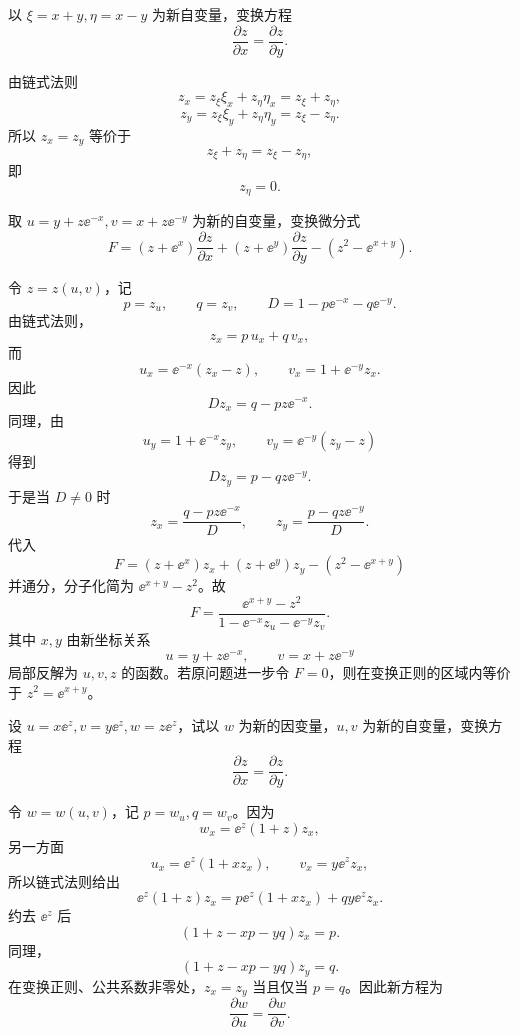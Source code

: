 \begin{xexercise}[3]
以 $\xi=x+y,\eta=x-y$ 为新自变量，变换方程
  \[
    \frac{\partial z}{\partial x}=\frac{\partial z}{\partial y}.
  \]
\end{xexercise}
\begin{xsolution}
由链式法则
\[
  z_x=z_\xi\xi_x+z_\eta\eta_x=z_\xi+z_\eta,
\]
\[
  z_y=z_\xi\xi_y+z_\eta\eta_y=z_\xi-z_\eta.
\]
所以 $z_x=z_y$ 等价于
\[
  z_\xi+z_\eta=z_\xi-z_\eta,
\]
即
\[
  \boxed{z_\eta=0}.
\]
\end{xsolution}


\begin{xexercise}[4]
取 $u=y+z\ee^{-x},v=x+z\ee^{-y}$ 为新的自变量，变换微分式
  \[
    F=(z+\ee^x)\frac{\partial z}{\partial x}
    +(z+\ee^y)\frac{\partial z}{\partial y}
    -(z^2-\ee^{x+y}).
  \]
\end{xexercise}
\begin{xsolution}
令 $z=z(u,v)$，记
\[
  p=z_u,
  \qquad q=z_v,
  \qquad
  D=1-p\ee^{-x}-q\ee^{-y}.
\]
由链式法则，
\[
  z_x=p\,u_x+q\,v_x,
\]
而
\[
  u_x=\ee^{-x}(z_x-z),
  \qquad
  v_x=1+\ee^{-y}z_x.
\]
因此
\[
  Dz_x=q-pz\ee^{-x}.
\]
同理，由
\[
  u_y=1+\ee^{-x}z_y,
  \qquad
  v_y=\ee^{-y}(z_y-z)
\]
得到
\[
  Dz_y=p-qz\ee^{-y}.
\]
于是当 $D\ne0$ 时
\[
  z_x=\frac{q-pz\ee^{-x}}D,
  \qquad
  z_y=\frac{p-qz\ee^{-y}}D.
\]
代入
\[
  F=(z+\ee^x)z_x+(z+\ee^y)z_y-(z^2-\ee^{x+y})
\]
并通分，分子化简为 $\ee^{x+y}-z^2$。故
\[
  \boxed{\displaystyle
    F=\frac{\ee^{x+y}-z^2}
    {1-\ee^{-x}z_u-\ee^{-y}z_v}}.
\]
其中 $x,y$ 由新坐标关系
\[
  u=y+z\ee^{-x},\qquad v=x+z\ee^{-y}
\]
局部反解为 $u,v,z$ 的函数。若原问题进一步令 $F=0$，则在变换正则的区域内等价于 $z^2=\ee^{x+y}$。
\end{xsolution}


\begin{xexercise}[5]
设 $u=x\ee^z,v=y\ee^z,w=z\ee^z$，试以 $w$ 为新的因变量，$u,v$ 为新的自变量，变换方程
  \[
    \frac{\partial z}{\partial x}=\frac{\partial z}{\partial y}.
  \]
\end{xexercise}
\begin{xsolution}
令 $w=w(u,v)$，记 $p=w_u,q=w_v$。因为
\[
  w_x=\ee^z(1+z)z_x,
\]
另一方面
\[
  u_x=\ee^z(1+xz_x),
  \qquad
  v_x=y\ee^z z_x,
\]
所以链式法则给出
\[
  \ee^z(1+z)z_x
  =p\ee^z(1+xz_x)+qy\ee^z z_x.
\]
约去 $\ee^z$ 后
\[
  (1+z-xp-yq)z_x=p.
\]
同理，
\[
  (1+z-xp-yq)z_y=q.
\]
在变换正则、公共系数非零处，$z_x=z_y$ 当且仅当 $p=q$。因此新方程为
\[
  \boxed{\displaystyle \frac{\partial w}{\partial u}
  =\frac{\partial w}{\partial v}}.
\]
\end{xsolution}



